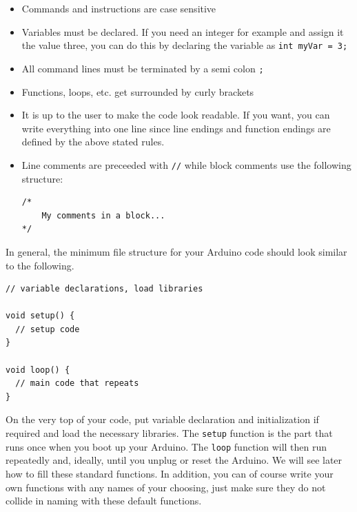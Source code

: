 \begin{itemize}
    \item Commands and instructions are case sensitive
    \item Variables must be declared. If you need an integer for example and assign it the value three, you can do this by declaring the variable as \lstinline{int myVar = 3;}
    \item All command lines must be terminated by a semi colon \lstinline{;}
    \item Functions, loops, etc. get surrounded by curly brackets
    \item It is up to the user to make the code look readable. If you want, you can write everything into one line since line endings and function endings are defined by the above stated rules.
    \item Line comments are preceeded with \lstinline{//} while block comments use the following structure:
    \begin{lstlisting}
/*
    My comments in a block...
*/
    \end{lstlisting}
\end{itemize}

In general, the minimum file structure for your Arduino code should look similar to the following.
\begin{lstlisting}
// variable declarations, load libraries

void setup() {
  // setup code
}

void loop() {
  // main code that repeats
}
\end{lstlisting}
On the very top of your code, put variable declaration and initialization if required and load the necessary libraries. The \lstinline{setup} function is the part that runs once when you boot up your Arduino. The \lstinline{loop} function will then run repeatedly and, ideally, until you unplug or reset the Arduino. We will see later how to fill these standard functions. In addition, you can of course write your own functions with any names of your choosing, just make sure they do not collide in naming with these default functions. 





